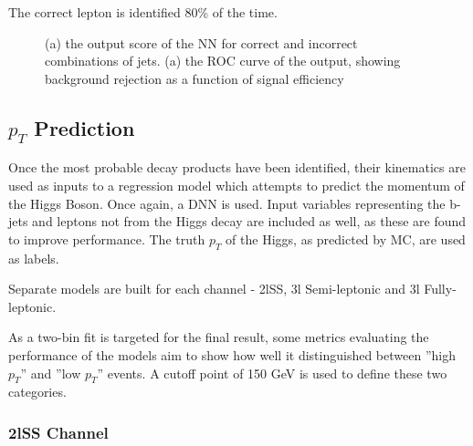 The correct lepton is identified 80\% of the time.

\begin{figure}[h!]
  \label{fig:higgs3lFresults}
  \caption{(a) the output score of the NN for correct and incorrect combinations of jets. (a) the ROC curve of the output, showing background rejection as a function of signal efficiency}
\end{figure} 


\subsection{$p_T$ Prediction}
\label{sec:ptReco}

Once the most probable decay products have been identified, their kinematics are used as inputs to a regression model which attempts to predict the momentum of the Higgs Boson. Once again, a DNN is used. Input variables representing the b-jets and leptons not from the Higgs decay are included as well, as these are found to improve performance. The truth $p_T$ of the Higgs, as predicted by MC, are used as labels.

Separate models are built for each channel - 2lSS, 3l Semi-leptonic and 3l Fully-leptonic.

As a two-bin fit is targeted for the final result, some metrics evaluating the performance of the models aim to show how well it distinguished between ''high $p_T$'' and ''low $p_T$'' events. A cutoff point of 150 GeV is used to define these two categories.

\subsubsection{2lSS Channel}
\label{subsec:pt2lSS}                                                                                                      

